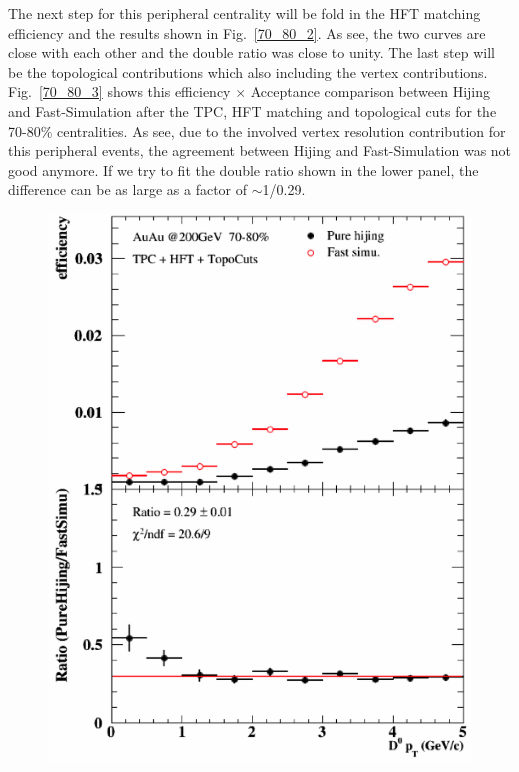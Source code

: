 The next step for this peripheral centrality will be fold in the HFT matching efficiency and the results shown in Fig.~\ref{70_80_2}. As see, the two curves are close with each other and the double ratio was close to unity. The last step will be the topological contributions which also including the vertex contributions. Fig.~\ref{70_80_3} shows this efficiency $\times$ Acceptance comparison between Hijing and Fast-Simulation after the TPC, HFT matching and topological cuts for the 70-80\% centralities. As see, due to the involved vertex resolution contribution for this peripheral events, the agreement between Hijing and Fast-Simulation was not good anymore. If we try to fit the double ratio shown in the lower panel, the difference can be as large as a factor of $\sim$1/0.29.


\begin{figure}[htbp]
\begin{minipage}[htbp]{0.47\linewidth}
\centering
\includegraphics[width=1.0\textwidth,angle=0]{figure/Run14_D0HFT/70_80.png}

\end{minipage}
\end{figure}
